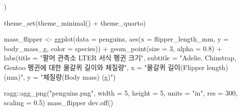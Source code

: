 \documentclass[
  letterpaper,
  DIV=11,
  numbers=noendperiod]{scrartcl}
\newenvironment{Shaded}{\begin{snugshade}}{\end{snugshade}}
\newcommand{\AttributeTok}[1]{\textcolor[rgb]{0.40,0.45,0.13}{#1}}
\newcommand{\DecValTok}[1]{\textcolor[rgb]{0.68,0.00,0.00}{#1}}
\newcommand{\FloatTok}[1]{\textcolor[rgb]{0.68,0.00,0.00}{#1}}
\newcommand{\FunctionTok}[1]{\textcolor[rgb]{0.28,0.35,0.67}{#1}}
\newcommand{\NormalTok}[1]{\textcolor[rgb]{0.00,0.23,0.31}{#1}}
\newcommand{\OtherTok}[1]{\textcolor[rgb]{0.00,0.23,0.31}{#1}}
\newcommand{\SpecialCharTok}[1]{\textcolor[rgb]{0.37,0.37,0.37}{#1}}
\newcommand{\StringTok}[1]{\textcolor[rgb]{0.13,0.47,0.30}{#1}}
\begin{document}
\begin{Shaded}
\begin{Highlighting}[]
\NormalTok{)}

\FunctionTok{theme\_set}\NormalTok{(}\FunctionTok{theme\_minimal}\NormalTok{() }\SpecialCharTok{+}\NormalTok{ theme\_quarto)}

\NormalTok{mass\_flipper }\OtherTok{\textless{}{-}} \FunctionTok{ggplot}\NormalTok{(}\AttributeTok{data =}\NormalTok{ penguins,}
                       \FunctionTok{aes}\NormalTok{(}\AttributeTok{x =}\NormalTok{ flipper\_length\_mm,}
                           \AttributeTok{y =}\NormalTok{ body\_mass\_g,}
                           \AttributeTok{color =}\NormalTok{ species)) }\SpecialCharTok{+}
  \FunctionTok{geom\_point}\NormalTok{(}\AttributeTok{size =} \DecValTok{3}\NormalTok{,}
             \AttributeTok{alpha =} \FloatTok{0.8}\NormalTok{) }\SpecialCharTok{+}
  \FunctionTok{labs}\NormalTok{(}\AttributeTok{title =} \StringTok{"팔머 관측소 LTER 서식 펭귄 크기"}\NormalTok{,}
       \AttributeTok{subtitle =} \StringTok{"Adelie, Chinstrap, Gentoo 펭귄에 대한 물갈퀴 길이와 체질량"}\NormalTok{,}
       \AttributeTok{x =} \StringTok{"물갈퀴 길이(Flipper length) (mm)"}\NormalTok{,}
       \AttributeTok{y =} \StringTok{"체질량(Body mass) (g)"}\NormalTok{)}


\NormalTok{ragg}\SpecialCharTok{::}\FunctionTok{agg\_png}\NormalTok{(}\StringTok{"penguins.png"}\NormalTok{, }\AttributeTok{width =} \DecValTok{5}\NormalTok{, }\AttributeTok{height =} \DecValTok{5}\NormalTok{, }\AttributeTok{units =} \StringTok{"in"}\NormalTok{, }\AttributeTok{res =} \DecValTok{300}\NormalTok{, }\AttributeTok{scaling =} \FloatTok{0.5}\NormalTok{)}
\NormalTok{mass\_flipper}
\FunctionTok{dev.off}\NormalTok{()}
\end{Highlighting}
\end{Shaded}
\end{document}
